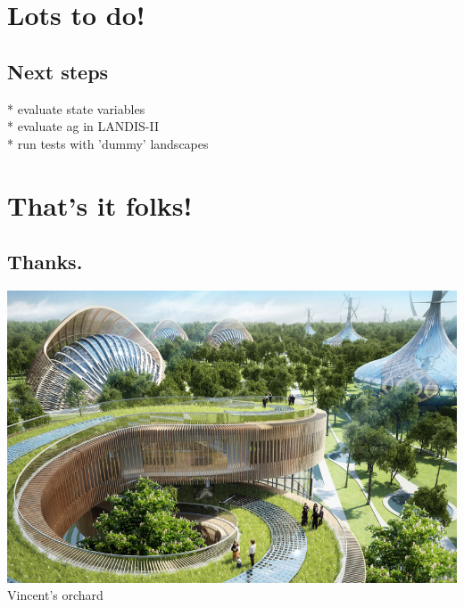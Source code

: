 \documentclass[
paper=128mm:96mm, %
fontsize=11pt, %
pagesize, %
parskip=half-, %
]{scrartcl} %
\theoremstyle{mythmstyle} %
\begin{document}
\clearpage
\section{Lots to do!}
\subsection{Next steps}
\small
\begin{flushleft}
* evaluate state variables\\
* evaluate ag in LANDIS-II\\
* run tests with 'dummy' landscapes
\end{flushleft}

\clearpage
\section{That's it folks!}
\subsection{Thanks.}
\centering \includegraphics[height=5 cm]{Image27.jpg}
Vincent's orchard
\clearpage
\end{document}
